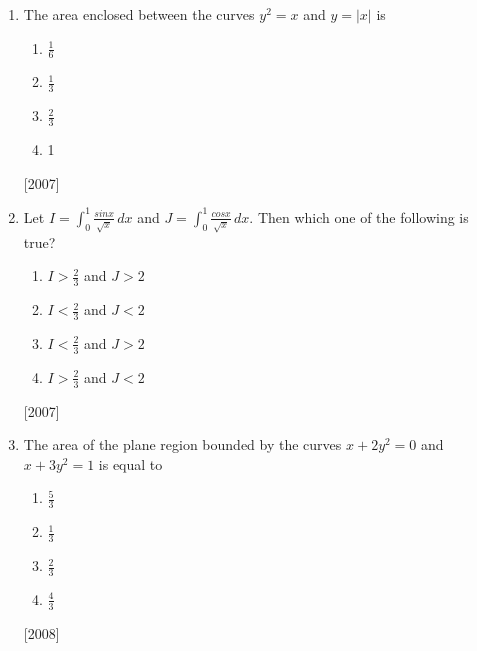 \documentclass[journal,12pt,twocolumn]{IEEEtran}
\theoremstyle{remark}
\begin{document}
\begin{enumerate}
		   \hfill [2007] 
	   \item 
		  The area enclosed between the curves $y^{2}=x$ and $y=|x|$ is	
		 \begin{enumerate}
		     \item $\frac{1}{6}$
		     \item $\frac{1}{3}$
		     \item $\frac{2}{3}$
		     \item 1
		 \end{enumerate}
		 \hfill [2007] 
	   \item 
		 Let $I=\int_{0}^{1} \frac{sinx}{\sqrt{x}} \,dx$ and $J=\int_{0}^{1} \frac{cosx}{\sqrt{x}} \,dx$. Then which one of the following is true?
		\begin{enumerate}
		    \item $I>\frac{2}{3}$ and $J>2$
		    \item $I<\frac{2}{3}$ and $J<2$
		    \item $I<\frac{2}{3}$ and $J>2$
		    \item $I>\frac{2}{3}$ and $J<2$
		\end{enumerate}
		\hfill [2007] 
	   \item 
		 The area of the plane region bounded by the curves $x+2y^{2}=0$ and $x+3y^{2}=1$ is equal to 
		\begin{enumerate}
		   \item $\frac{5}{3}$
		   \item $\frac{1}{3}$
		   \item $\frac{2}{3}$
		   \item $\frac{4}{3}$
		\end{enumerate}
		\hfill [2008] 
	\end{enumerate}
	
\end{document}
